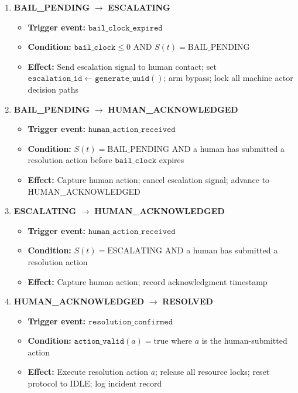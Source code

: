 \begin{enumerate}
  \item \textbf{BAIL\_PENDING} $\rightarrow$ \textbf{ESCALATING}
  \begin{itemize}
    \item \textbf{Trigger event:} $\texttt{bail\_clock\_expired}$
    \item \textbf{Condition:} $\texttt{bail\_clock} \leq 0$ AND $S(t) = \text{BAIL\_PENDING}$
    \item \textbf{Effect:} Send escalation signal to human contact; set $\texttt{escalation\_id} \leftarrow \texttt{generate\_uuid}()$; arm bypass; lock all machine actor decision paths
  \end{itemize}

  \item \textbf{BAIL\_PENDING} $\rightarrow$ \textbf{HUMAN\_ACKNOWLEDGED}
  \begin{itemize}
    \item \textbf{Trigger event:} $\texttt{human\_action\_received}$
    \item \textbf{Condition:} $S(t) = \text{BAIL\_PENDING}$ AND a human has submitted a resolution action before $\texttt{bail\_clock}$ expires
    \item \textbf{Effect:} Capture human action; cancel escalation signal; advance to HUMAN\_ACKNOWLEDGED
  \end{itemize}

  \item \textbf{ESCALATING} $\rightarrow$ \textbf{HUMAN\_ACKNOWLEDGED}
  \begin{itemize}
    \item \textbf{Trigger event:} $\texttt{human\_action\_received}$
    \item \textbf{Condition:} $S(t) = \text{ESCALATING}$ AND a human has submitted a resolution action
    \item \textbf{Effect:} Capture human action; record acknowledgment timestamp
  \end{itemize}

  \item \textbf{HUMAN\_ACKNOWLEDGED} $\rightarrow$ \textbf{RESOLVED}
  \begin{itemize}
    \item \textbf{Trigger event:} $\texttt{resolution\_confirmed}$
    \item \textbf{Condition:} $\texttt{action\_valid}(a) = \text{true}$ where $a$ is the human-submitted action
    \item \textbf{Effect:} Execute resolution action $a$; release all resource locks; reset protocol to IDLE; log incident record
  \end{itemize}


\end{enumerate}

